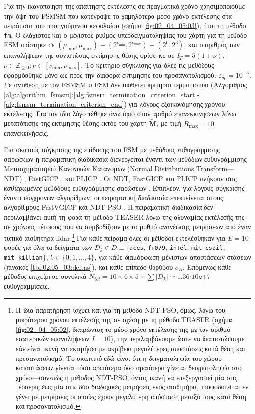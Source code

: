 Για την ικανοποίηση της απαίτησης εκτέλεσης σε πραγματικό χρόνο χρησιμοποιούμε
την όψη του FSMSM που κατέγραψε το χαμηλότερο μέσο χρόνο εκτέλεσης στα
πειράματα του προηγούμενου κεφαλαίου (σχήμα \ref{fig:02_04_05:03}), ήτοι τη
μέθοδο \texttt{fm}.  Ο ελάχιστος και ο μέγιστος ρυθμός υπερδειγματοληψίας του
χάρτη για τη μέθοδο FSM ορίστηκε σε $(\mu_{\min},\mu_{\max}) \equiv
(2^{\nu_{\min}},2^{\nu_{\max}}) \equiv (2^0,2^3)$, και ο αριθμός των
επαναλήψεων της συνιστώσας εκτίμησης θέσης ορίστηκε σε $I_T=5(1+\nu)$, $\nu \in
\mathbb{Z}_{\geq 0}: \nu \in [\nu_{\min}, \nu_{\max}]$. Το κριτήριο σύγκλισης
για όλες τις μεθόδους εφαρμόσθηκε μόνο ως προς την διαφορά εκτίμησης του
προσανατολισμού: $\varepsilon_{\delta p} = 10^{-5}$. Σε αντίθεση με τον FSMSM ο
FSM δεν υιοθετεί κριτήριο τερματισμού (Αλγόριθμος
\ref{alg:algorithm_fsmsm}:\ref{alg:fsmsm_termination_criterion_start}-\ref{alg:fsmsm_termination_criterion_end})
για λόγους εξοικονόμησης χρόνου εκτέλεσης. Για τον ίδιο λόγο τέθηκε άνω όριο
στον αριθμό επανεκκινήσεων λόγω μετατόπισης της εκτίμησης θέσης εκτός του χάρτη
$\widetilde{\bm{M}}$, με τιμή $R_{\max} = 10$ επανεκκινήσεις.

Για σκοπούς σύγκρισης της επίδοσης του FSM με μεθόδους ευθυγράμμισης σαρώσεων η
πειραματική διαδικασία διενεργείται έναντι των μεθόδων ευθυγράμμισης
Μετασχηματισμού Κανονικών Κατανομών (Normal Distributions Transform---NDT)
\cite{Bibera,ndt_code}, FastGICP \cite{Segal2009a,fgicp_code}, και PLICP
\cite{Censi2008a,plicp_code}. Οι NDT, FastGICP και PLICP ανήκουν στις
\textit{καθιερωμένες} μεθόδους ευθυγράμμισης σαρώσεων
\cite{Koide2021a,Xu2018b,Sobreira2019b,Pishehvari2019b,Qingshan2019c,Pham2021b}.
Επιπλέον, για λόγους σύγκρισης έναντι σύγχρονων αλγορίθμων, οι πειραματική
διαδικασία επεκτείνεται στους αλγορίθμους FastVGICP
\cite{Koide2021a,fgicp_code} και NDT-PSO \cite{Bouraine2021,ndt_pso_code}. Η
πειραματική διαδικασία δεν περιλαμβάνει αυτή τη φορά τη μέθοδο TEASER λόγω της
αδυναμίας εκτέλεσής της σε χρόνους τέτοιους που να συμβαδίζουν με το ρυθμό
ανανέωσης μετρήσεων από έναν τυπικό αισθητήρα lidar.\footnote{Η ίδια παρατήρηση
ισχύει και για τη μέθοδο NDT-PSO, όμως, λόγω του μικρότερου χρόνου εκτέλεσής
της σε σχέση με τη μέθοδο TEASER (σχήμα \ref{fig:02_04_05:02},
διαιρώντας το μέσο χρόνο εκτέλεσης της με τον αριθμό εσωτερικών επαναλήψεων
$I=10$), την περιλαμβάνουμε ώστε να διαπιστώσουμε εάν είναι ικανή να εκτιμήσει
με ακρίβεια μεγαλύτερες αποστάσεις κατά θέση και προσανατολισμό. Το σκεπτικό
εδώ είναι ότι η δειγματοληψία του χώρου καταστάσεων γίνεται τόσο αραιότερα όσο
αραιότερα γίνεται δειγματοληψία στο χρόνο---συνεπώς η μέθοδος NDT-PSO, όντας
ικανή να επεξεργαστεί μία στις τέσσερις έως μία στις δύο διαδοχικές μετρήσεις
ενός αισθητήρα, τροφοδοτείται εν γένει με μετρήσεις οι οποίες έχουν μεγαλύτερη
απόσταση μεταξύ τους κατά θέση και προσανατολισμό.} Για κάθε πείραμα όλες οι
μέθοδοι εκτελέσθηκαν για $E = 10$ φορές για όλα τα δείγματα των $D_k \in D
\equiv \{$\texttt{aces}, \texttt{fr079}, \texttt{intel}, \texttt{mit\_csail},
\texttt{mit\_killian}$\}$, $k \in \{0,1,\dots,4\}$, για κάθε διαμόρφωση
μέγιστων αποστάσεων στάσεων (πίνακας \ref{tbl:02:05_03:deltas}), και κάθε
επίπεδο θορύβου $\sigma_R$.  Επομένως κάθε μέθοδος επιχείρησε συνολικά $N_{tot}
= 10 \times 6 \times 5 \times \sum |D_k|\simeq 1.36$$\cdot10$$\texttt{e}$$+$$7$
ευθυγραμμίσεις.

